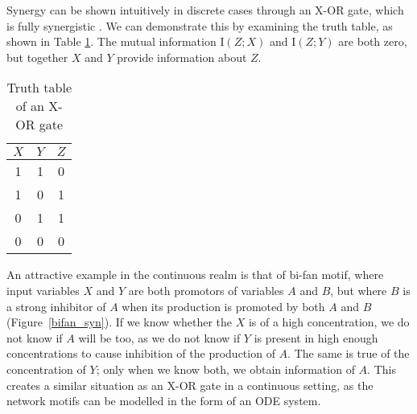 \documentclass[../main.tex]{subfiles}
\begin{document}
Synergy can be shown intuitively in discrete cases through an X-OR gate, which is fully synergistic \cite{quax2017quantifying}.
We can demonstrate this by examining the truth table, as shown in Table \ref{XOR}.
The mutual information $\mathrm{I}\left( Z;X \right)$ and $\mathrm{I} \left( Z;Y \right)$ are both zero, but together $X$ and $Y$ provide information about $Z$.

\begin{table}[ht]
\begin{center}
\begin{tabular}{|c|c||c|}
\hline
$X$ & $Y$ & $Z$ \\
\hline
\hline
1 & 1 & 0 \\
1 & 0 & 1 \\
0 & 1 & 1 \\
0 & 0 & 0 \\
\hline
\end{tabular}
\end{center}
\caption{Truth table of an X-OR gate}
\label{XOR}
\end{table}

An attractive example in the continuous realm is that of bi-fan motif, where input variables $X$ and $Y$ are both promotors of variables $A$ and $B$, but where $B$ is a strong inhibitor of $A$ when its production is promoted by both $A$ and $B$ (Figure~\ref{bifan_syn}).
If we know whether the $X$ is of a high concentration, we do not know if $A$ will be too, as we do not know if $Y$ is present in high enough concentrations to cause inhibition of the production of $A$.
The same is true of the concentration of $Y$; only when we know both, we obtain information of $A$.
This creates a similar situation as an X-OR gate in a continuous setting, as the network motifs can be modelled in the form of an ODE system.
\end{document}
